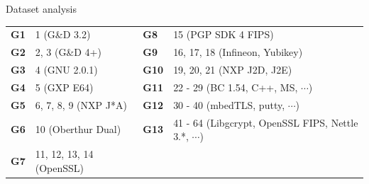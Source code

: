 \documentclass{beamer}
\begin{document}
\begin{darkframes}
\begin{frame}{Dataset analysis}
      \begin{table}[!b]
        {\carlitoTLF %
        \begin{tabularx}{\textwidth}{sX|sX}
          \toprule
          \textbf{G1} & 1 {\color[HTML]{9B9B9B} (G\&D 3.2)} & \textbf{G8} & 15 {\color[HTML]{9B9B9B} (PGP SDK 4 FIPS)} \\
          \textbf{G2} & 2, 3 {\color[HTML]{9B9B9B} (G\&D 4+)} & \textbf{G9} & 16, 17, 18 {\color[HTML]{9B9B9B} (Infineon, Yubikey)} \\
          \textbf{G3} & 4 {\color[HTML]{9B9B9B} (GNU 2.0.1)} & \textbf{G10} & 19, 20, 21 {\color[HTML]{9B9B9B} (NXP J2D, J2E)} \\
          \textbf{G4} & 5 {\color[HTML]{9B9B9B} (GXP E64)} & \textbf{G11} & 22 - 29 {\color[HTML]{9B9B9B} (BC 1.54, C++, MS, $\cdots$)} \\
          \textbf{G5} & 6, 7, 8, 9 {\color[HTML]{9B9B9B} (NXP J*A)} & \textbf{G12} & 30 - 40 {\color[HTML]{9B9B9B} (mbedTLS, putty, $\cdots$)} \\     
          \textbf{G6} & 10 {\color[HTML]{9B9B9B} (Oberthur Dual)} & \textbf{G13} & 41 - 64 {\color[HTML]{9B9B9B} (Libgcrypt, OpenSSL FIPS, Nettle 3.*, $\cdots$)} \\
          \textbf{G7} & 11, 12, 13, 14 {\color[HTML]{9B9B9B} (OpenSSL)} & & \\
          \bottomrule
        \end{tabularx}}
      \end{table}
    \end{frame}


\end{darkframes}
\end{document}
